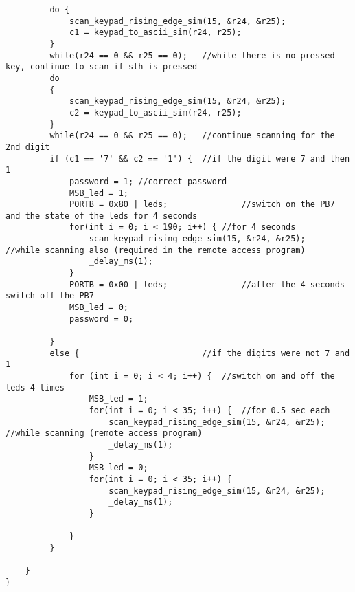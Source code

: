 \documentclass{article}
\begin{document}
\begin{verbatim}
		 do {
			 scan_keypad_rising_edge_sim(15, &r24, &r25);
			 c1 = keypad_to_ascii_sim(r24, r25);
		 }
		 while(r24 == 0 && r25 == 0);	//while there is no pressed key, continue to scan if sth is pressed
		 do
		 {
			 scan_keypad_rising_edge_sim(15, &r24, &r25);
			 c2 = keypad_to_ascii_sim(r24, r25);
		 }
		 while(r24 == 0 && r25 == 0);	//continue scanning for the 2nd digit
		 if (c1 == '7' && c2 == '1') {	//if the digit were 7 and then 1
			 password = 1; //correct password
			 MSB_led = 1;				
			 PORTB = 0x80 | leds;				//switch on the PB7 and the state of the leds for 4 seconds
			 for(int i = 0; i < 190; i++) {	//for 4 seconds
				 scan_keypad_rising_edge_sim(15, &r24, &r25);	//while scanning also (required in the remote access program)
				 _delay_ms(1);
			 }
			 PORTB = 0x00 | leds;				//after the 4 seconds switch off the PB7
			 MSB_led = 0;
			 password = 0;
		 
		 }
		 else {							//if the digits were not 7 and 1
			 for (int i = 0; i < 4; i++) {	//switch on and off the leds 4 times
				 MSB_led = 1;
				 for(int i = 0; i < 35; i++) {	//for 0.5 sec each
					 scan_keypad_rising_edge_sim(15, &r24, &r25);	//while scanning (remote access program)
					 _delay_ms(1);
				 }
				 MSB_led = 0;
				 for(int i = 0; i < 35; i++) {
					 scan_keypad_rising_edge_sim(15, &r24, &r25);
					 _delay_ms(1);
				 }
				
			 }
		 }
		
    }
}

\end{verbatim}
\end{document}
